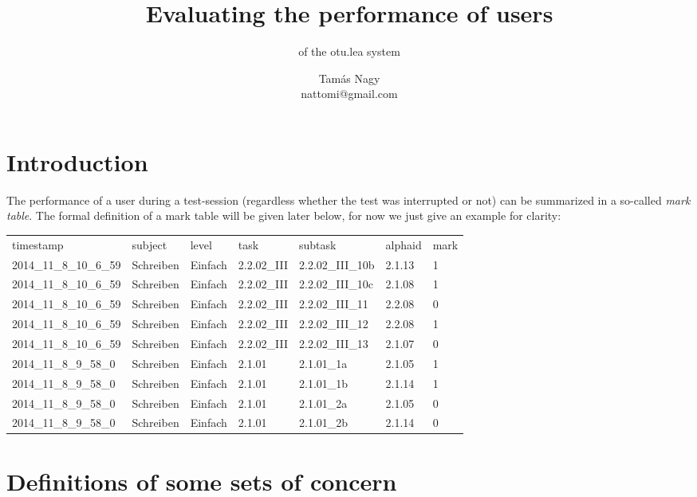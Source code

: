 \documentclass{scrartcl}
\title{Evaluating the performance of users}
\subtitle{of the otu.lea system}
\author{Tamás Nagy\\ \small nattomi@gmail.com}
\begin{document}
\maketitle
\section{Introduction}
The performance of a user during a test-session (regardless whether the test was interrupted or not) can be summarized in a so-called \emph{mark table}. The formal definition of a mark table will be given later below, for now we just give an example for clarity:

\vspace{.5cm}
\begin{tabular}{lllllll}
timestamp	& subject	& level	& task	& subtask	& alphaid	& mark\\
2014\_11\_8\_10\_6\_59	& Schreiben	& Einfach	& 2.2.02\_III	& 2.2.02\_III\_10b	& 2.1.13	& 1\\
2014\_11\_8\_10\_6\_59	& Schreiben	& Einfach	& 2.2.02\_III	& 2.2.02\_III\_10c	& 2.1.08	& 1\\
2014\_11\_8\_10\_6\_59	& Schreiben	& Einfach	& 2.2.02\_III	& 2.2.02\_III\_11	& 2.2.08	& 0\\
2014\_11\_8\_10\_6\_59	& Schreiben	& Einfach	& 2.2.02\_III	& 2.2.02\_III\_12	& 2.2.08	& 1\\
2014\_11\_8\_10\_6\_59	& Schreiben	& Einfach	& 2.2.02\_III	& 2.2.02\_III\_13	& 2.1.07	& 0\\
2014\_11\_8\_9\_58\_0	& Schreiben	& Einfach	& 2.1.01	& 2.1.01\_1a	& 2.1.05	& 1\\
2014\_11\_8\_9\_58\_0	& Schreiben	& Einfach	& 2.1.01	& 2.1.01\_1b	& 2.1.14	& 1\\
2014\_11\_8\_9\_58\_0	& Schreiben	& Einfach	& 2.1.01	& 2.1.01\_2a	& 2.1.05	& 0\\
2014\_11\_8\_9\_58\_0	& Schreiben	& Einfach	& 2.1.01	& 2.1.01\_2b	& 2.1.14	& 0\\
\end{tabular}

\section{Definitions of some sets of concern}
\end{document}
